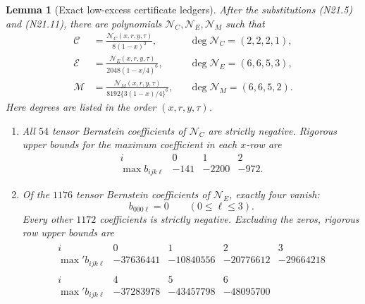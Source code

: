 \documentclass[11pt]{article}
\newtheorem{lemma}[theorem]{Lemma}
\theoremstyle{definition}
\theoremstyle{remark}
\begin{document}
\begin{lemma}[Exact low-excess certificate ledgers]
\label{lem:f2v21-ledgers}
After the substitutions \textup{(N21.5)} and \textup{(N21.11)}, there are
polynomials \(\mathcal N_C,\mathcal N_E,\mathcal N_M\) such that
\begin{align}
 \mathcal C&=\frac{\mathcal N_C(x,r,y,\tau)}
                   {8(1-x)^2},
 &&\deg\mathcal N_C=(2,2,2,1), \tag{N21.12}\\
 \mathcal E&=\frac{\mathcal N_E(x,r,y,\tau)}
                   {2048(1-x/4)^6},
 &&\deg\mathcal N_E=(6,6,5,3), \tag{N21.13}\\
 \mathcal M&=\frac{\mathcal N_M(x,r,y,\tau)}
                   {8192\{3(1-x)/4\}^6},
 &&\deg\mathcal N_M=(6,6,5,2). \tag{N21.14}
\end{align}
Here degrees are listed in the order \((x,r,y,\tau)\).

\begin{enumerate}[label=\textup{(\roman*)}]
\item All \(54\) tensor Bernstein coefficients of \(\mathcal N_C\) are
strictly negative.  Rigorous upper bounds for the maximum coefficient in
each \(x\)-row are
\[
\begin{array}{c|rrr}
 i&0&1&2\\ \hline
 \max b_{ijk\ell}&-141&-2200&-972.
\end{array}
\tag{N21.15}
\]

\item Of the \(1176\) tensor Bernstein coefficients of
\(\mathcal N_E\), exactly four vanish:
\[
 b_{000\ell}=0\qquad(0\leq\ell\leq3).
 \tag{N21.16}
\]
Every other \(1172\) coefficients is strictly negative.  Excluding the
zeros, rigorous row upper bounds are
\[
\begin{gathered}
\begin{array}{c|rrrr}
 i&0&1&2&3\\ \hline
 \max{}'b_{ijk\ell}
 &-37636441&-10840556&-20776612&-29664218
\end{array}\\[1mm]
\begin{array}{c|rrr}
 i&4&5&6\\ \hline
 \max{}'b_{ijk\ell}
 &-37283978&-43457798&-48095700
\end{array}
\end{gathered}
\tag{N21.17}
\]


\end{enumerate}
\end{lemma}
\end{document}
